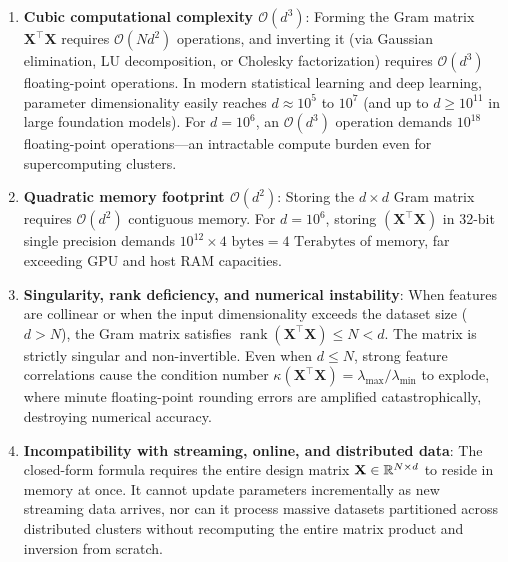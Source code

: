 \begin{enumerate}[noitemsep,topsep=2pt,parsep=0pt,partopsep=0pt]
  \item \textbf{Cubic computational complexity $\mathcal{O}(d^3)$}:
    Forming the Gram matrix $\mathbf{X}^\top \mathbf{X}$ requires $\mathcal{O}(N d^2)$ operations, and inverting it (via Gaussian elimination, LU decomposition, or Cholesky factorization) requires $\mathcal{O}(d^3)$ floating-point operations. In modern statistical learning and deep learning, parameter dimensionality easily reaches $d \approx 10^5$ to $10^7$ (and up to $d \ge 10^{11}$ in large foundation models). For $d = 10^6$, an $\mathcal{O}(d^3)$ operation demands $10^{18}$ floating-point operations---an intractable compute burden even for supercomputing clusters.
  \item \textbf{Quadratic memory footprint $\mathcal{O}(d^2)$}:
    Storing the $d \times d$ Gram matrix requires $\mathcal{O}(d^2)$ contiguous memory. For $d = 10^6$, storing $(\mathbf{X}^\top \mathbf{X})$ in 32-bit single precision demands $10^{12} \times 4\text{ bytes} = 4\text{ Terabytes}$ of memory, far exceeding GPU and host RAM capacities.
  \item \textbf{Singularity, rank deficiency, and numerical instability}:
    When features are collinear or when the input dimensionality exceeds the dataset size ($d > N$), the Gram matrix satisfies $\operatorname{rank}(\mathbf{X}^\top \mathbf{X}) \le N < d$. The matrix is strictly singular and non-invertible. Even when $d \le N$, strong feature correlations cause the condition number $\kappa(\mathbf{X}^\top \mathbf{X}) = \lambda_{\max} / \lambda_{\min}$ to explode, where minute floating-point rounding errors are amplified catastrophically, destroying numerical accuracy.
  \item \textbf{Incompatibility with streaming, online, and distributed data}:
    The closed-form formula requires the entire design matrix $\mathbf{X} \in \mathbb{R}^{N \times d}$ to reside in memory at once. It cannot update parameters incrementally as new streaming data arrives, nor can it process massive datasets partitioned across distributed clusters without recomputing the entire matrix product and inversion from scratch.
\end{enumerate}

